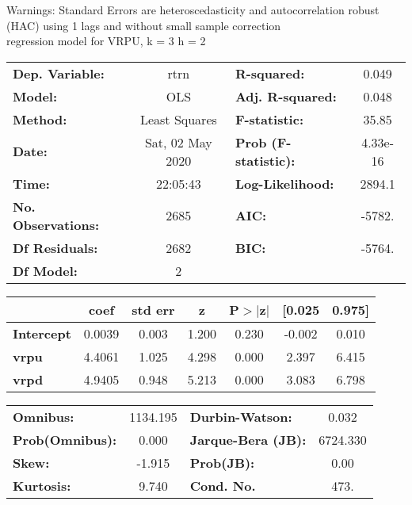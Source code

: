 Warnings: \newline
 [1] Standard Errors are heteroscedasticity and autocorrelation robust (HAC) using 1 lags and without small sample correction\\ 

regression model for VRPU, k = 3 h = 2\begin{center}
\begin{tabular}{lclc}
\toprule
\textbf{Dep. Variable:}    &       rtrn       & \textbf{  R-squared:         } &     0.049   \\
\textbf{Model:}            &       OLS        & \textbf{  Adj. R-squared:    } &     0.048   \\
\textbf{Method:}           &  Least Squares   & \textbf{  F-statistic:       } &     35.85   \\
\textbf{Date:}             & Sat, 02 May 2020 & \textbf{  Prob (F-statistic):} &  4.33e-16   \\
\textbf{Time:}             &     22:05:43     & \textbf{  Log-Likelihood:    } &    2894.1   \\
\textbf{No. Observations:} &        2685      & \textbf{  AIC:               } &    -5782.   \\
\textbf{Df Residuals:}     &        2682      & \textbf{  BIC:               } &    -5764.   \\
\textbf{Df Model:}         &           2      & \textbf{                     } &             \\
\bottomrule
\end{tabular}
\begin{tabular}{lcccccc}
                   & \textbf{coef} & \textbf{std err} & \textbf{z} & \textbf{P$> |$z$|$} & \textbf{[0.025} & \textbf{0.975]}  \\
\midrule
\textbf{Intercept} &       0.0039  &        0.003     &     1.200  &         0.230        &       -0.002    &        0.010     \\
\textbf{vrpu}      &       4.4061  &        1.025     &     4.298  &         0.000        &        2.397    &        6.415     \\
\textbf{vrpd}      &       4.9405  &        0.948     &     5.213  &         0.000        &        3.083    &        6.798     \\
\bottomrule
\end{tabular}
\begin{tabular}{lclc}
\textbf{Omnibus:}       & 1134.195 & \textbf{  Durbin-Watson:     } &    0.032  \\
\textbf{Prob(Omnibus):} &   0.000  & \textbf{  Jarque-Bera (JB):  } & 6724.330  \\
\textbf{Skew:}          &  -1.915  & \textbf{  Prob(JB):          } &     0.00  \\
\textbf{Kurtosis:}      &   9.740  & \textbf{  Cond. No.          } &     473.  \\
\bottomrule
\end{tabular}
\end{center}

